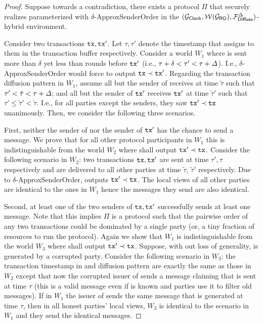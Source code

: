 \begin{proof}
	Suppose towards a contradiction, there exists a protocol $\Pi$ that securely realizes \funcFairLedger parameterized with $\delta$-\textsf{ApproxSenderOrder} in the $(\mathcal{G}_{\mathsf{Clock}}, \mathcal{W}(\mathcal{G}_{\mathsf{RO}}), \mathcal{F}_{\mathsf{Diffuse}}^\Delta)$-hybrid environment.

	Consider two transactions $\mathtt{tx}, \mathtt{tx}'$.
	Let $\tau, \tau'$ denote the timestamp that \funcFairLedger assigns to them in the transaction buffer respectively.
	Consider a world $W_1$ where \tx is sent more than $\delta$ yet less than \delay rounds before $\mathtt{tx}'$ (i.e., $\tau + \delta < \tau' < \tau + \varDelta$).
	I.e., $\delta$-\textsf{ApproxSenderOrder} would force \funcFairLedger to output $\mathtt{tx} \prec \mathtt{tx}'$.
	Regarding the transaction diffusion pattern in $W_1$, assume all but the sender of \tx receives \tx at time $\tilde{\tau}$ such that $\tau' < \tilde{\tau} < \tau + \varDelta$;
	and all but the sender of $\mathtt{tx}'$ receives $\mathtt{tx}'$ at time $\tilde{\tau}'$ such that $\tau' \le \tilde{\tau}' < \tilde{\tau}$.
	I.e., for all parties except the senders, they saw $\mathtt{tx}' \prec \mathtt{tx}$
	unanimously.
	Then, we consider the following three scenarios.

	First, neither the sender of \tx nor the sender of $\mathtt{tx}'$ has the chance to send a message.
	We prove that for all other protocol participants in $W_1$ this is indistinguishable from the world $W_2$ where \funcFairLedger shall output $\mathtt{tx}' \prec \mathtt{tx}$.
	Consider the following scenario in $W_2$: two transactions $\mathtt{tx}, \mathtt{tx}'$ are sent at time $\tau', \tau$ respectively and are delivered to all other parties at time  $\tilde{\tau}$, $\tilde{\tau}'$ respectively.
	Due to $\delta$-\textsf{ApproxSenderOrder}, \funcFairLedger outputs $\mathtt{tx}' \prec \mathtt{tx}$.
	The local views of all other parties are identical to the ones in $W_1$ hence the messages they send are also identical.

	Second, at least one of the two senders of $\mathtt{tx}, \mathtt{tx}'$ successfully sends at least one message.
	Note that this implies $\Pi$ is a protocol such that the pairwise order of any two transactions could be dominated by a single party (or, a tiny fraction of resources to run the protocol).
	Again we show that $W_1$ is indistinguishable from the world $W_3$ where \funcFairLedger shall output $\mathtt{tx}' \prec \mathtt{tx}$.
	Suppose, with out loss of generality, \tx is generated by a corrupted party.
	Consider the following scenario in $W_3$: the transaction timestamp in \funcFairLedger and diffusion pattern are exactly the same as those in $W_2$ except that now the corrupted issuer of \tx sends a message claiming that \tx is sent at time $\tau$ (this is a valid message even if \delay is known and parties use it to filter old messages).
	If in $W_1$ the issuer of \tx sends the same message that \tx is generated at time $\tau$, then in all honest parties' local views, $W_3$ is identical to the scenario in $W_1$ and they send the identical messages.


\end{proof}
